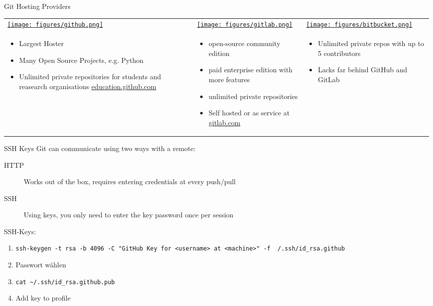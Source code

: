 \begin{frame}{Git Hosting Providers}
  \small
  \begin{tabu}{@{} X[,C] @{} X[,C] @{} X[,C] @{}}
    \href{https://github.com}{\texttt{[image: figures/github.png]}} &
    \href{https://gitlab.com}{\texttt{[image: figures/gitlab.png]}} &
    \href{https://bitbucket.org}{\texttt{[image: figures/bitbucket.png]}} \\
    \begin{itemize}
      \item Largest Hoster
      \item Many Open Source Projects, e.g. Python
      \item Unlimited private repositories for students and reasearch organisations
        \href{https://education.github.com}{education.github.com}
    \end{itemize}
    &
    \begin{itemize}
      \item open-source community edition
      \item paid enterprise edition with more features
      \item unlimited private repositories
      \item Self hosted or as service at \href{https://gitlab.com}{gitlab.com}
    \end{itemize}
    &
    \begin{itemize}
      \item Unlimited private repos with up to 5 contributors
      \item Lacks far behind GitHub and GitLab
    \end{itemize}
  \end{tabu}
  \begin{center}
  \end{center}
\end{frame}

\begin{frame}{SSH Keys}
  Git can communicate using two ways with a remote:
  \begin{description}
    \item[HTTP] Works out of the box, requires entering credentials at every push/pull
    \item[SSH] Using keys, you only need to enter the key password once per session
  \end{description}

  SSH-Keys:
  \begin{enumerate}
    \item \texttt{ssh-keygen -t rsa -b 4096 -C "GitHub Key for <username> at <machine>" -f ~/.ssh/id\_rsa.github}
    \item Passwort wählen
    \item \texttt{cat \textasciitilde/.ssh/id\_rsa.github.pub}
    \item Add key to profile
  \end{enumerate}
\end{frame}


